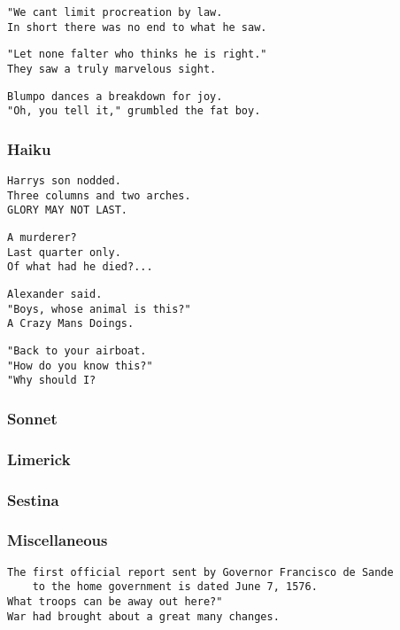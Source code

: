 \documentclass[10pt]{article}
\begin{document}
\begin{verbatim}
"We cant limit procreation by law.
In short there was no end to what he saw.
\end{verbatim}

\begin{verbatim}
"Let none falter who thinks he is right."
They saw a truly marvelous sight.
\end{verbatim}

\begin{verbatim}
Blumpo dances a breakdown for joy.
"Oh, you tell it," grumbled the fat boy.
\end{verbatim}

\subsubsection{Haiku}
\begin{verbatim}
Harrys son nodded.
Three columns and two arches.
GLORY MAY NOT LAST.
\end{verbatim}

\begin{verbatim}
A murderer?
Last quarter only.
Of what had he died?...
\end{verbatim}

\begin{verbatim}
Alexander said. 
"Boys, whose animal is this?" 
A Crazy Mans Doings.
\end{verbatim}

\begin{verbatim}
"Back to your airboat. 
"How do you know this?" 
"Why should I?
\end{verbatim}
\subsubsection{Sonnet}
\subsubsection{Limerick}
\subsubsection{Sestina}
\subsubsection{Miscellaneous}
\begin{verbatim}
The first official report sent by Governor Francisco de Sande
    to the home government is dated June 7, 1576.
What troops can be away out here?"
War had brought about a great many changes.
\end{verbatim}
\end{document}
